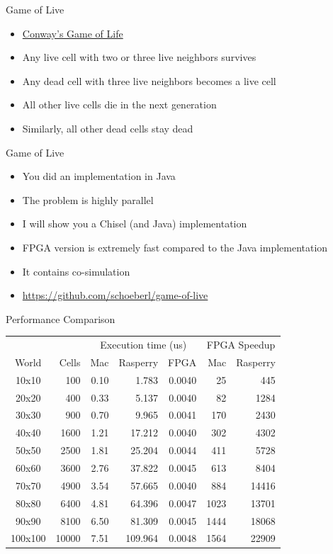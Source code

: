 \begin{frame}[fragile]{Game of Live}
\begin{itemize}
\item \href{https://en.wikipedia.org/wiki/Conway\%27s_Game_of_Life}{Conway's Game of Life}
\item Any live cell with two or three live neighbors survives
\item Any dead cell with three live neighbors becomes a live cell
\item All other live cells die in the next generation
\item Similarly, all other dead cells stay dead
\end{itemize}
\end{frame}

\begin{frame}[fragile]{Game of Live}
\begin{itemize}
\item You did an implementation in Java
\item The problem is highly parallel
\item I will show you a Chisel (and Java) implementation
\item FPGA version is extremely fast compared to the Java implementation
\item It contains co-simulation
\item \url{https://github.com/schoeberl/game-of-live}
\end{itemize}
\end{frame}

\begin{frame}[fragile]{Performance Comparison}
\begin{table}
  \centering
\begin{tabular}{crrrrrr}
    \toprule
    & &\multicolumn{3}{c}{Execution time (us)} & \multicolumn{2}{c}{FPGA Speedup}\\
World & Cells&Mac&Rasperry&FPGA& Mac& Rasperry\\
\midrule
10x10 & 100&0.10&1.783&0.0040&25&445\\
20x20 & 400&0.33&5.137&0.0040&82&1284\\
30x30 & 900&0.70&9.965&0.0041&170&2430\\
40x40 & 1600&1.21&17.212&0.0040&302&4302\\
50x50 & 2500&1.81&25.204&0.0044&411&5728\\
60x60 & 3600&2.76&37.822&0.0045&613&8404\\
70x70 & 4900&3.54&57.665&0.0040&884&14416\\
80x80 & 6400&4.81&64.396&0.0047&1023&13701\\
90x90 & 8100&6.50&81.309&0.0045&1444&18068\\
100x100 & 10000&7.51&109.964&0.0048&1564&22909\\
\bottomrule
\end{tabular}
    \label{tab:speedup}
\end{table}
\end{frame}


